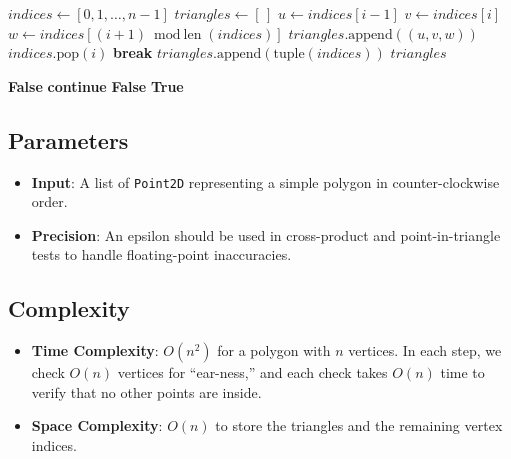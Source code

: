 \begin{algorithm}[htbp]
\caption{Ear Clipping Triangulation}
\label{alg:ear_clipping}
\begin{algorithmic}[1]
  \State $indices \gets [0, 1, \ldots, n-1]$
  \State $triangles \gets [\,]$
      \State $u \gets indices[i-1]$
      \State $v \gets indices[i]$
      \State $w \gets indices[(i+1) \bmod \text{len}(indices)]$
        \State $triangles.\text{append}((u, v, w))$
        \State $indices.\text{pop}(i)$
        \State \textbf{break}
      \EndIf
    \EndFor
  \EndWhile
  \State $triangles.\text{append}(\text{tuple}(indices))$
  \State \Return $triangles$
\EndFunction

    \State \Return \textbf{False}
  \EndIf
      \State \textbf{continue}
    \EndIf
      \State \Return \textbf{False}
    \EndIf
  \EndFor
  \State \Return \textbf{True}
\EndFunction
\end{algorithmic}
\end{algorithm}

\subsection{Parameters}

\begin{itemize}
\item \textbf{Input}: A list of \texttt{Point2D} representing a simple polygon in counter-clockwise order.
\item \textbf{Precision}: An epsilon should be used in cross-product and point-in-triangle tests to handle floating-point inaccuracies.
\end{itemize}

\subsection{Complexity}

\begin{itemize}
\item \textbf{Time Complexity}: $O(n^2)$ for a polygon with $n$ vertices. In each step, we check $O(n)$ vertices for ``ear-ness,'' and each check takes $O(n)$ time to verify that no other points are inside.
\item \textbf{Space Complexity}: $O(n)$ to store the triangles and the remaining vertex indices.
\end{itemize}

